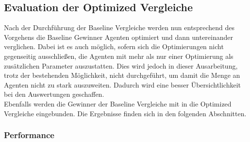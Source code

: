 \subsection{Evaluation der Optimized Vergleiche}
Nach der Durchführung der Baseline Vergleiche werden nun entsprechend des Vorgehens  die Baseline Gewinner Agenten  optimiert und dann untereinander verglichen.
Dabei ist es auch möglich, sofern sich die Optimierungen nicht gegenseitig ausschließen, die Agenten mit mehr als nur einer Optimierung als zusätzlichen Parameter auszustatten. Dies wird jedoch in dieser Ausarbeitung, trotz der bestehenden Möglichkeit, nicht durchgeführt, um damit die Menge an Agenten nicht zu stark auszuweiten. Dadurch wird eine besser Übersichtlichkeit bei den Auswertungen geschaffen.\\
Ebenfalls werden die Gewinner der Baseline Vergleiche mit in die Optimized Vergleiche eingebunden. Die Ergebnisse finden sich in den folgenden Abschnitten.

\subsubsection{Performance} \label{sec:Evaluation_Performance_Optimized}

